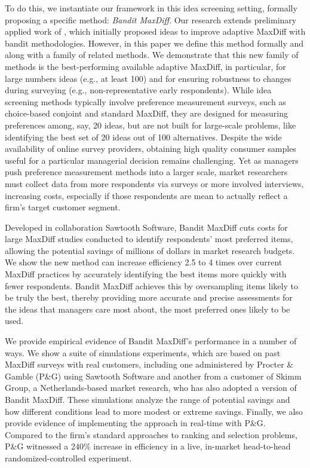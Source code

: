 \documentclass[blindrev,mnsc]{informs3}
\begin{document}
To do this, we instantiate our framework in this idea screening setting, formally proposing a specific method: \emph{Bandit MaxDiff}. Our research extends preliminary applied work of \cite{fairchildetal2015banditmaxdiff}, which initially proposed ideas to improve adaptive MaxDiff with bandit methodologies. However, in this paper we define this method formally and along with a family of related methods. We demonstrate that this new family of methods is the best-performing available adaptive MaxDiff, in particular, for large numbers ideas (e.g., at least 100) and for ensuring robustness to changes during surveying (e.g., non-representative early respondents). While idea screening methods typically involve preference measurement surveys, such as choice-based conjoint and standard MaxDiff, they are designed for measuring preferences among, say, 20 ideas, but are not built for large-scale problems, like identifying the best set of 20 ideas out of 100 alternatives. Despite the wide availability of online survey providers, obtaining high quality consumer samples useful for a particular managerial decision remains challenging. Yet as managers push preference measurement methods into a larger scale, market researchers must collect data from more respondents via surveys or more involved interviews, increasing costs, especially if those respondents are mean to actually reflect a firm's target customer segment.

Developed in collaboration Sawtooth Software, Bandit MaxDiff cuts costs for large MaxDiff studies conducted to identify respondents’ most preferred items, allowing the potential savings of millions of dollars in market research budgets. We show the new method can increase efficiency 2.5 to 4 times over current MaxDiff practices by accurately identifying the best items more quickly with fewer respondents. Bandit MaxDiff achieves this by oversampling items likely to be truly the best, thereby providing more accurate and precise assessments for the ideas that managers care most about, the most preferred ones likely to be used. 

We provide empirical evidence of Bandit MaxDiff's performance in a number of ways. We show a suite of simulations experiments, which are based on past MaxDiff surveys with real customers, including one administered by Procter \& Gamble (P\&G) using Sawtooth Software \citep{fairchildetal2015banditmaxdiff} and another from a customer of Skimm Group, a Netherlands-based market research, who has also adopted a version of Bandit MaxDiff. These simulations analyze the range of potential savings and how different conditions lead to more modest or extreme savings. Finally, we also provide evidence of implementing the approach in real-time with P\&G. Compared to the firm's standard approaches to ranking and selection problems, P\&G witnessed a 240\% increase in efficiency in a live, in-market head-to-head randomized-controlled experiment.
\end{document}
